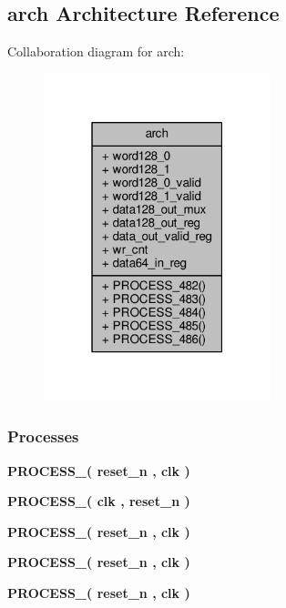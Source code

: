 \subsection{arch Architecture Reference}
\label{classunpack__64__to__48_1_1arch}


Collaboration diagram for arch\+:\nopagebreak
\begin{figure}[H]
\begin{center}
\leavevmode
\includegraphics[width=187pt]{d9/d5f/classunpack__64__to__48_1_1arch__coll__graph}
\end{center}
\end{figure}
\subsubsection*{Processes}
 \begin{DoxyCompactItemize}
\item 
{\bf P\+R\+O\+C\+E\+S\+S\+\_}{\bfseries  ( {\bfseries {\bfseries {\bf reset\+\_\+n}} \textcolor{vhdlchar}{ }} , {\bfseries {\bfseries {\bf clk}} \textcolor{vhdlchar}{ }} )}
\item 
{\bf P\+R\+O\+C\+E\+S\+S\+\_}{\bfseries  ( {\bfseries {\bfseries {\bf clk}} \textcolor{vhdlchar}{ }} , {\bfseries {\bfseries {\bf reset\+\_\+n}} \textcolor{vhdlchar}{ }} )}
\item 
{\bf P\+R\+O\+C\+E\+S\+S\+\_}{\bfseries  ( {\bfseries {\bfseries {\bf reset\+\_\+n}} \textcolor{vhdlchar}{ }} , {\bfseries {\bfseries {\bf clk}} \textcolor{vhdlchar}{ }} )}
\item 
{\bf P\+R\+O\+C\+E\+S\+S\+\_}{\bfseries  ( {\bfseries {\bfseries {\bf reset\+\_\+n}} \textcolor{vhdlchar}{ }} , {\bfseries {\bfseries {\bf clk}} \textcolor{vhdlchar}{ }} )}
\item 
{\bf P\+R\+O\+C\+E\+S\+S\+\_}{\bfseries  ( {\bfseries {\bfseries {\bf reset\+\_\+n}} \textcolor{vhdlchar}{ }} , {\bfseries {\bfseries {\bf clk}} \textcolor{vhdlchar}{ }} )}
\end{DoxyCompactItemize}
